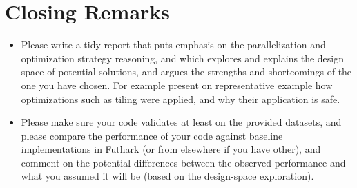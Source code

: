\documentclass[a4paper,11pt]{article}
\begin{document}
\section{Closing Remarks}

\begin{itemize}
    \item Please write a tidy report that puts emphasis on the parallelization
            and optimization strategy reasoning, and which explores and explains 
            the design space of potential solutions, and argues the strengths 
            and shortcomings of the one you have chosen.  For example present
            on representative example how optimizations such as tiling were
            applied, and why their application is safe.

    \item Please make sure your code validates at least on the provided datasets,
            and please compare the performance of your code against baseline 
            implementations in Futhark (or from elsewhere if you have other), 
            and comment on the potential differences between the observed
            performance and what you assumed it will be (based on the
            design-space exploration).
\end{itemize}



%
\end{document}
